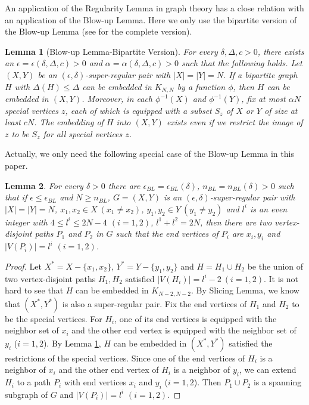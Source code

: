 \documentclass[11pt]{article}
\newtheorem{lemma}{Lemma}
\begin{document}
An application of the Regularity Lemma in graph theory has a close relation with an application of the Blow-up Lemma. Here we only use the bipartite version of the Blow-up Lemma (see \cite{blowup} for the complete version).

\begin{lemma}[Blow-up Lemma-Bipartite Version]\label{blowup}
For every $\delta, \Delta, c>0$, there exists an $\epsilon =\epsilon(\delta, \Delta, c)>0$ and $\alpha =\alpha(\delta, \Delta, c)>0$ such that the following holds. Let $(X,Y)$ be an $(\epsilon, \delta)$-super-regular pair with $|X|=|Y|=N$. If a bipartite graph $H$ with $\Delta (H)\leq \Delta$ can be embedded in $K_{N,N}$ by a function $\phi$, then $H$ can be embedded  in $(X,Y)$. Moreover, in each $\phi^{-1}(X)$ and $\phi^{-1}(Y)$, fix at most $\alpha N$ special vertices $z$, each of which is equipped with a subset $S_z$ of $X$ or $Y$ of size at least $cN$. The embedding of $H$ into $(X,Y)$ exists even if we restrict the image of $z$ to be $S_z$ for all special vertices $z$.
\end{lemma}

Actually, we only need the following special case of the Blow-up Lemma in this paper.

\begin{lemma}\label{blow2}
For every $\delta >0$ there are $\epsilon_{BL}=\epsilon_{BL}(\delta)$, $n_{BL}=n_{BL}(\delta)>0$ such that if $\epsilon \leq \epsilon_{BL}$ and $N\geq n_{BL}$, $G=(X,Y)$ is an $(\epsilon, \delta)$-super-regular pair with $|X|=|Y|=N$, $x_1,x_2\in X\ (x_1\not =x_2)$, $y_1,y_2\in Y\ (y_1\not =y_2)$ and $l^i$ is an even integer with $4\leq l^i\leq 2N-4$ $(i=1,2)$, $l^1+l^2=2N$, then there are two vertex-disjoint paths $P_1$ and $P_2$ in $G$ such that the end vertices of $P_i$ are $x_i, y_i$ and $|V(P_i)|=l^i$ $(i=1,2)$.
\end{lemma}

\begin{proof}
Let $X^*=X-\{x_1,x_2\}$, $Y^*=Y-\{y_1,y_2\}$ and $H=H_1\cup H_2$ be the union of two vertex-disjoint paths $H_1, H_2$ satisfied $|V(H_i)|=l^i-2\ (i=1,2)$. It is not hard to see that $H$ can be embedded in $K_{N-2,N-2}$. By Slicing Lemma, we know that $(X^*,Y^*)$ is also a super-regular pair. Fix the end vertices of $H_1$ and $H_2$ to be the special vertices. For $H_i$, one of its end vertices is equipped with the neighbor set of $x_i$ and the other end vertex is equipped with the neighbor set of $y_i$ ($i=1,2$). By Lemma \ref{blowup}, $H$ can be embedded in $(X^*,Y^*)$ satisfied the restrictions of the special vertices. Since one of the end vertices of $H_i$ is a neighbor of $x_i$ and the other end vertex of $H_i$ is a neighbor of $y_i$, we can extend $H_i$ to a path $P_i$ with end vertices $x_i$ and $y_i$ ($i=1,2$). Then $P_1\cup P_2$ is a spanning subgraph of $G$ and $|V(P_i)|=l^i$ $(i=1,2)$.
\end{proof}
\end{document}
